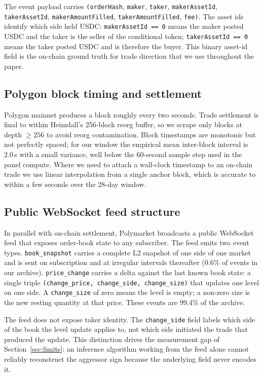 \documentclass[11pt,a4paper,twocolumn]{article}
\begin{document}
The event payload carries
\texttt{(orderHash},
\texttt{maker}, \texttt{taker},
\texttt{makerAssetId}, \texttt{takerAssetId},
\texttt{makerAmountFilled},
\texttt{takerAmountFilled}, \texttt{fee)}.
The asset ids identify
which side held USDC: \texttt{makerAssetId == 0} means the maker
posted USDC and the taker is the seller of the conditional token;
\texttt{takerAssetId == 0} means the taker posted USDC and is
therefore the buyer. This binary asset-id field is the on-chain
ground truth for trade direction that we use throughout the paper.

\subsection{Polygon block timing and settlement}

Polygon mainnet produces a block roughly every two seconds. Trade
settlement is final to within Heimdall's 256-block reorg buffer,
so we scrape only blocks at depth $\geq 256$ to avoid reorg
contamination. Block timestamps are monotonic but not perfectly
spaced; for our window the empirical mean inter-block interval is
2.0\,s with a small variance, well below the 60-second sample step
used in the panel compute. Where we need to attach a wall-clock
timestamp to an on-chain trade we use linear interpolation from a
single anchor block, which is accurate to within a few seconds over
the 28-day window.

\subsection{Public WebSocket feed structure}

In parallel with on-chain settlement, Polymarket broadcasts a public
WebSocket feed that exposes order-book state to any subscriber. The
feed emits two event types. \texttt{book\_snapshot} carries a
complete L2 snapshot of one side of one market and is sent on
subscription and at irregular intervals thereafter (0.6\% of events
in our archive). \texttt{price\_change} carries a delta against the
last known book state: a single triple
\texttt{(change\_price, change\_side, change\_size)} that updates one
level on one side. A \texttt{change\_size} of zero means the level
is empty; a non-zero size is the new resting quantity at that price.
These events are 99.4\% of the archive.

The feed does not expose taker identity. The \texttt{change\_side}
field labels which side of the book the level update applies to,
not which side initiated the trade that produced the update. This
distinction drives the measurement gap of Section~\ref{sec:limits}:
an inference algorithm working from the feed alone cannot reliably
reconstruct the aggressor sign because the underlying field never
encodes it.
\end{document}
